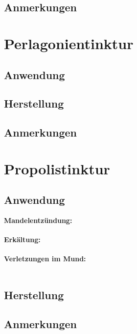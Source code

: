 \subsection{Anmerkungen}





\section{Perlagonientinktur}

\subsection{Anwendung}

\subsection{Herstellung}

\subsection{Anmerkungen}





\section{Propolistinktur}

\subsection{Anwendung}

\textbf{Mandelentzündung:} \\ \\
\textbf{Erkältung:} \\ \\
\textbf{Verletzungen im Mund:} \\ \\


\subsection{Herstellung}

\subsection{Anmerkungen}

